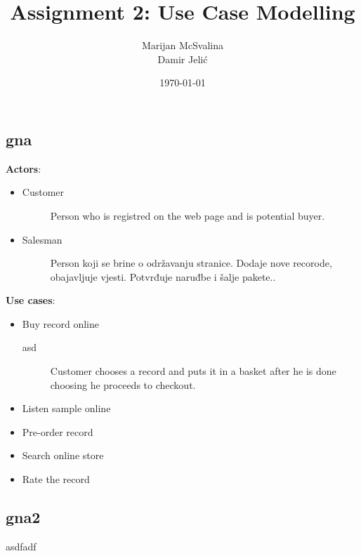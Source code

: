 \documentclass[12pt, titlepage]{article}
\title{Assignment 2: Use Case Modelling}
\date{\today}
\author{Marijan McSvalina \\ Damir Jelić}
\begin{document}
\maketitle 

\setcounter{section}{2}
\subsection{gna}
{\bf Actors}:
\begin{itemize}
\item
    Customer
    \begin{description}
    \item[]Person who is registred on the web page and is potential buyer.
    \end{description}
\item
    Salesman
    \begin{description}
    \item[]Person koji se brine o održavanju stranice. Dodaje nove recorode, obajavljuje vjesti. Potvrđuje naruđbe i šalje pakete..
    \end{description}
\end{itemize}
{\bf Use cases}:
\begin{itemize}
\item
    Buy record online
    \begin{description}
    \item[asd]
   Customer chooses a record and puts it in a basket after he is done choosing he proceeds to checkout.
    \end{description}
\item
    Listen sample online
\item
    Pre-order record
\item 
    Search online store
\item 
    Rate the record
\end{itemize}
\subsection{gna2}
asdfadf
\end{document}
